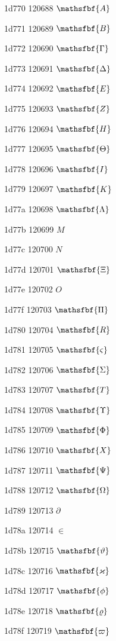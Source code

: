 \documentclass[11pt]{article}
\begin{document}
1d770 120688 \ensuremath{\mathsfbf{A}}

1d771 120689 \ensuremath{\mathsfbf{B}}

1d772 120690 \ensuremath{\mathsfbf{\Gamma}}

1d773 120691 \ensuremath{\mathsfbf{\Delta}}

1d774 120692 \ensuremath{\mathsfbf{E}}

1d775 120693 \ensuremath{\mathsfbf{Z}}

1d776 120694 \ensuremath{\mathsfbf{H}}

1d777 120695 \ensuremath{\mathsfbf{\Theta}}

1d778 120696 \ensuremath{\mathsfbf{I}}

1d779 120697 \ensuremath{\mathsfbf{K}}

1d77a 120698 \ensuremath{\mathsfbf{\Lambda}}

1d77b 120699 \ensuremath{M}

1d77c 120700 \ensuremath{N}

1d77d 120701 \ensuremath{\mathsfbf{\Xi}}

1d77e 120702 \ensuremath{O}

1d77f 120703 \ensuremath{\mathsfbf{\Pi}}

1d780 120704 \ensuremath{\mathsfbf{R}}

1d781 120705 \ensuremath{\mathsfbf{\varsigma}}

1d782 120706 \ensuremath{\mathsfbf{\Sigma}}

1d783 120707 \ensuremath{\mathsfbf{T}}

1d784 120708 \ensuremath{\mathsfbf{\Upsilon}}

1d785 120709 \ensuremath{\mathsfbf{\Phi}}

1d786 120710 \ensuremath{\mathsfbf{X}}

1d787 120711 \ensuremath{\mathsfbf{\Psi}}

1d788 120712 \ensuremath{\mathsfbf{\Omega}}

1d789 120713 \ensuremath{\partial}

1d78a 120714 \ensuremath{\in}

1d78b 120715 \ensuremath{\mathsfbf{\vartheta}}

1d78c 120716 \ensuremath{\mathsfbf{\varkappa}}

1d78d 120717 \ensuremath{\mathsfbf{\phi}}

1d78e 120718 \ensuremath{\mathsfbf{\varrho}}

1d78f 120719 \ensuremath{\mathsfbf{\varpi}}
\end{document}
